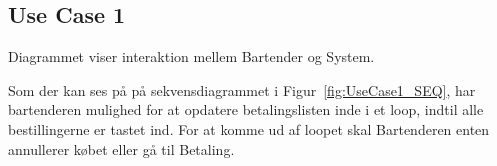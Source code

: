 \subsection{Use Case 1}
Diagrammet viser interaktion mellem Bartender og System.


Som der kan ses på på sekvensdiagrammet i Figur~\ref{fig:UseCase1_SEQ}, har bartenderen mulighed for at opdatere betalingslisten inde i et loop, indtil alle bestillingerne er tastet ind. For at komme ud af loopet skal Bartenderen enten annullerer købet eller gå til Betaling.
